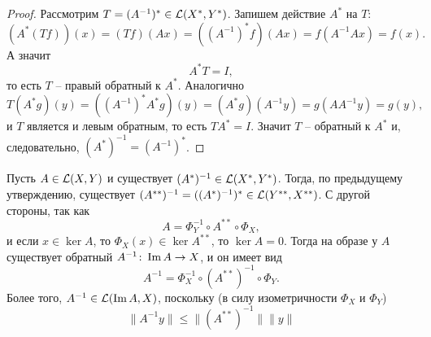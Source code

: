 \begin{proof}
    Рассмотрим $T = (A^{-1})^* \in \mathcal{L}(X^*, Y^*)$.
    Запишем действие $A^*$ на $T\colon$
    \[
        (A^*(Tf))(x) = (Tf)(Ax) = ((A^{-1})^* f)(Ax) = f(A^{-1}A x) = f(x).
    \]
    А значит
    \[
        A^* T = I,
    \]
    то есть $T$ -- правый обратный к $A^*$.
    Аналогично
    \[
        T(A^* g)(y) = ((A^{-1})^* A^* g)(y) = (A^* g)(A^{-1}y) = g(AA^{-1}y) = g(y),
    \]
    и $T$ является и левым обратным, то есть $TA^* = I$.
    Значит $T$ -- обратный к $A^*$ и, следовательно, $(A^*)^{-1} = (A^{-1})^*$.
\end{proof}
\begin{note}
    Пусть $A \in \mathcal{L}(X, Y)$ и существует $(A^*)^{-1} \in \mathcal{L}(X^*, Y^*)$.
    Тогда, по предыдущему утверждению, существует $(A^{**})^{-1} = ((A^*)^{-1})^* \in \mathcal{L}(Y^{**}, X^{**})$.
    С другой стороны, так как
    \[
        A = \Phi_Y^{-1} \circ A^{**} \circ \Phi_X,
    \]
    и если $x \in \ker A$, то $\Phi_X(x) \in \ker A^{**}$, то $\ker A = 0$.
    Тогда на образе у $A$ существует обратный $A^{-1}\colon \operatorname{Im} A \to X$, и он имеет вид
    \[
        A^{-1} = \Phi_X^{-1} \circ (A^{**})^{-1} \circ \Phi_Y.
    \]
    Более того, $A^{-1} \in \mathcal{L}(\operatorname{Im} A, X)$, поскольку (в силу изометричности $\Phi_X$ и $\Phi_Y$)
    \[
        \|A^{-1} y\| \leq \|(A^{**})^{-1}\| \|y\|
    \]
\end{note}
